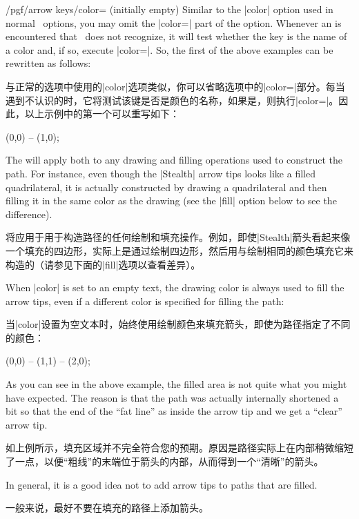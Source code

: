 \begin{key}{/pgf/arrow keys/color= (initially \normalfont empty)}
    Similar to the |color| option used in normal \tikzname\ options, you may
    omit the |color=| part of the option. Whenever an  is
    encountered that \tikzname\ does not recognize, it will test whether the
    key is the name of a color and, if so, execute |color=|.
    So, the first of the above examples can be rewritten as follows:
    
    与正常的\tikzname 选项中使用的|color|选项类似，你可以省略选项中的|color=|部分。每当遇到\tikzname 不认识的时，它将测试该键是否是颜色的名称，如果是，则执行|color=|。因此，以上示例中的第一个可以重写如下：

\begin{codeexample}[width=3cm,preamble={\usetikzlibrary{arrows.meta}}]
 \draw [red, arrows = {-Stealth[blue]}] (0,0) -- (1,0);
\end{codeexample}

    The  will apply both to any drawing and filling operations used
    to construct the path. For instance, even though the |Stealth| arrow tips
    looks like a filled quadrilateral, it is actually constructed by drawing a
    quadrilateral and then filling it in the same color as the drawing (see the
    |fill| option below to see the difference).

    将应用于用于构造路径的任何绘制和填充操作。例如，即使|Stealth|箭头看起来像一个填充的四边形，实际上是通过绘制四边形，然后用与绘制相同的颜色填充它来构造的（请参见下面的|fill|选项以查看差异）。

    When |color| is set to an empty text, the drawing color is always used to
    fill the arrow tips, even if a different color is specified for filling the
    path:
    
    当|color|设置为空文本时，始终使用绘制颜色来填充箭头，即使为路径指定了不同的颜色：
\begin{codeexample}[width=3cm,preamble={\usetikzlibrary{arrows.meta}}]
 \draw [draw=red, fill=red!50, arrows = {-Stealth[length=10pt]}]
                          (0,0) -- (1,1) -- (2,0);
\end{codeexample}
    As you can see in the above example, the filled area is not quite what you
    might have expected. The reason is that the path was actually internally
    shortened a bit so that the end of the ``fat line'' as inside the arrow tip
    and we get a ``clear'' arrow tip.

    如上例所示，填充区域并不完全符合您的预期。原因是路径实际上在内部稍微缩短了一点，以便“粗线”的末端位于箭头的内部，从而得到一个“清晰”的箭头。

    In general, it is a good idea not to add arrow tips to paths that are
    filled.

    一般来说，最好不要在填充的路径上添加箭头。
\end{key}

